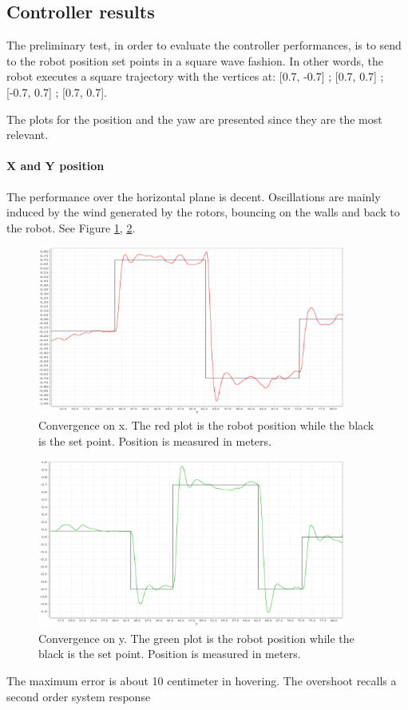 \subsection{Controller results}
\label{sec:conresults}
The preliminary test, in order to evaluate the controller performances, is to send to the robot position set points in a square wave fashion. In other words, the robot executes a square trajectory with the vertices at: [0.7, -0.7] ; [0.7, 0.7] ; [-0.7, 0.7] ; [0.7, 0.7].

 The plots for the position and the yaw are presented since they are the most relevant.

\paragraph{X and Y position}  The performance over the horizontal plane is decent. Oscillations are mainly induced by the wind generated by the rotors, bouncing on the walls and back to the robot. See Figure \ref{figure:xconv}, \ref{figure:yconv}.

\begin{figure}[H]
	\centering
	\noindent
	\includegraphics[width=0.9\textwidth]{x_conv.png}
	\caption[Convergence on x]{Convergence on x. The red plot is the robot position while the black is the set point. Position is measured in meters.}
	\label{figure:xconv}
\end{figure}

\begin{figure}[H]
	\centering
	\noindent
	\includegraphics[width=0.9\textwidth]{y_conv.png}
	\caption[Convergence on y]{Convergence on y. The green plot is the robot position while the black is the set point. Position is measured in meters.}
	\label{figure:yconv}
\end{figure}
\noindent
The maximum error is about 10 centimeter in hovering. The overshoot recalls a second order system response \\
